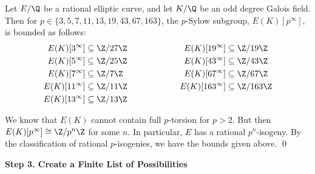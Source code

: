 \begin{frame}[plain]
\footnotesize
\begin{lem}
Let $E/\Q$ be a rational elliptic curve, and let $K/\Q$ be an odd degree Galois field. Then for $p \in \{ 3, 5, 7, 11, 13, 19, 43, 67, 163 \}$, the $p$-Sylow subgroup, $E(K)[p^\infty]$, is bounded as follows:
	\[
	\begin{aligned}
	E(K)[3^\infty] &\subseteq \Z/27\Z &\hspace{2cm} E(K)[19^\infty] &\subseteq \Z/19\Z \\
	E(K)[5^\infty] &\subseteq \Z/25\Z & E(K)[43^\infty] &\subseteq \Z/43\Z \\
	E(K)[7^\infty] &\subseteq \Z/7\Z & E(K)[67^\infty] &\subseteq \Z/67\Z \\
	E(K)[11^\infty] &\subseteq \Z/11\Z & E(K)[163^\infty] &\subseteq \Z/163\Z \\
	E(K)[13^\infty] &\subseteq \Z/13\Z & &
	\end{aligned}
	\]
\end{lem} \pspace

\pf We know that $E(K)$ cannot contain full $p$-torsion for $p > 2$. But then $E(K)[p^\infty] \cong \Z/p^n\Z$ for some $n$. In particular, $E$ has a rational $p^n$-isogeny. By the classification of rational $p$-isogenies, we have the bounds given above. \hfill\qed
\end{frame}





\begin{frame}[plain]
\vfill
\begin{center} {\bfseries \Large \textcolor{UniGray}{Step 3. Create a Finite List of Possibilities}} \end{center}
\vfill 
\end{frame}






